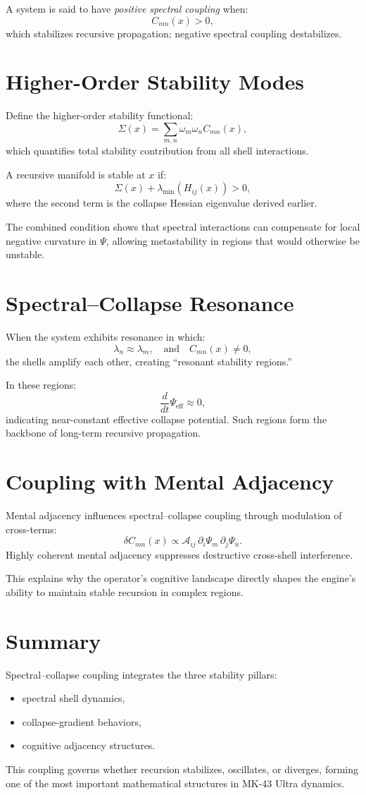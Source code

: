 A system is said to have \emph{positive spectral coupling} when:
\[
C_{mn}(x) > 0,
\]
which stabilizes recursive propagation; negative spectral coupling destabilizes.

\section{Higher-Order Stability Modes}
Define the higher-order stability functional:
\[
\Sigma(x) = \sum_{m,n} \omega_m \omega_n C_{mn}(x),
\]
which quantifies total stability contribution from all shell interactions.

A recursive manifold is stable at $x$ if:
\[
\Sigma(x) + \lambda_{\min}(H_{ij}(x)) > 0,
\]
where the second term is the collapse Hessian eigenvalue derived earlier.

The combined condition shows that spectral interactions can compensate for local negative curvature in $\Psi$, allowing metastability in regions that would otherwise be unstable.

\section{Spectral–Collapse Resonance}
When the system exhibits resonance in which:
\[
\lambda_n \approx \lambda_m,
\quad\text{and}\quad
C_{mn}(x) \neq 0,
\]
the shells amplify each other, creating ``resonant stability regions.''

In these regions:
\[
\frac{d}{dt} \Psi_{\mathrm{eff}} \approx 0,
\]
indicating near-constant effective collapse potential. Such regions form the backbone of long-term recursive propagation.

\section{Coupling with Mental Adjacency}
Mental adjacency influences spectral–collapse coupling through modulation of cross-terms:
\[
\delta C_{mn}(x) \propto \mathcal{A}_{ij} \,\partial_i \Psi_m \,\partial_j \Psi_n.
\]
Highly coherent mental adjacency suppresses destructive cross-shell interference.

This explains why the operator's cognitive landscape directly shapes the engine's ability to maintain stable recursion in complex regions.

\section{Summary}
Spectral–collapse coupling integrates the three stability pillars:
\begin{itemize}
  \item spectral shell dynamics,
  \item collapse-gradient behaviors,
  \item cognitive adjacency structures.
\end{itemize}

This coupling governs whether recursion stabilizes, oscillates, or diverges, forming one of the most important mathematical structures in MK-43 Ultra dynamics.
